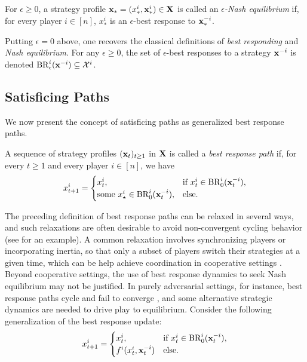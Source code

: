 \begin{definition}
    For $\epsilon \geq 0$, a strategy profile ${\mathbf{x}}_{*} = ( x^{i}_{*}, {\mathbf{x}}^{i}_{*} ) \in {\mathbf{X}}$ is called an \emph{$\epsilon$-Nash equilibrium} if, for every player $i \in [n]$, $x^i_{*}$ is an $\epsilon$-best response to ${\mathbf{x}}^{-i}_{*}$. 
\end{definition}

Putting $\epsilon = 0$ above, one recovers the classical definitions of \emph{best responding} and \emph{Nash equilibrium}. For any $\epsilon \geq 0$, the set of $\epsilon$-best responses to a strategy ${\mathbf{x}}^{-i}$ is denoted ${\rm BR}^i_{\epsilon} ( {\mathbf{x}}^{-i} ) \subseteq \mathcal{X}^i$. 



\subsection{Satisficing Paths}


We now present the concept of satisficing paths as generalized best response paths. 

\begin{definition}
    A sequence of strategy profiles $({\mathbf{x}}_t)_{t \geq 1}$ in ${\mathbf{X}}$ is called a \emph{best response path} if, for every $t \geq 1$ and every player $i \in [n]$, we have
    \[
        x^i_{t+1}= 
            \begin{cases}
                x^i_t,                                          &\text{if } x^i_t \in {\rm BR}^i_0 ( {\mathbf{x}}^{-i}_t), \\
                \text{some } x_{\star}^{i} \in {\rm BR}^i_0 ({\mathbf{x}}^{-i}_t),   &\text{else}. 
            \end{cases} 
    \]
\end{definition}

The preceding definition of best response paths can be relaxed in several ways, and such relaxations are often desirable to avoid non-convergent cycling behavior (see \cite{mertikopoulos2018cycles} for an example). A common relaxation involves synchronizing players or incorporating inertia, so that only a subset of players switch their strategies at a given time, which can be help achieve coordination in cooperative settings \cite{marden2012revisiting,swenson2018distributed,yongacoglu2022decentralized}. Beyond cooperative settings, the use of best response dynamics to seek Nash equilibrium may not be justified. In purely adversarial settings, for instance, best response paths cycle and fail to converge \cite{balcan2023nash}, and some alternative strategic dynamics are needed to drive play to equilibrium. Consider the following generalization of the best response update:
\[
    x^i_{t+1}= 
        \begin{cases}
            x^i_t,                                          &\text{if } x^i_t \in {\rm BR}^i_0 ( {\mathbf{x}}^{-i}_t), \\
            f^i ( x^i_t, {\mathbf{x}}^{-i}_t )                      &\text{else}. 
        \end{cases} 
\]

